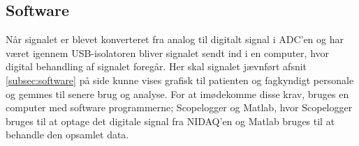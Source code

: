 \subsection{Software}
Når signalet er blevet konverteret fra analog til digitalt signal i ADC’en og har været igennem USB-isolatoren bliver signalet sendt ind i en computer, hvor digital behandling af signalet foregår. Her skal signalet jævnført afsnit \ref{subsec:software} på side \pageref{subsec:software} kunne vises grafisk til patienten og fagkyndigt personale og gemmes til senere brug og analyse. For at imødekomme disse krav, bruges en computer med software programmerne; Scopelogger og Matlab, hvor Scopelogger bruges til at optage det  digitale signal fra NIDAQ'en og Matlab bruges til at behandle den opsamlet data. 



